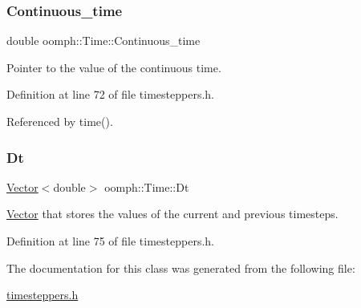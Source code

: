 \subsubsection{\texorpdfstring{Continuous\+\_\+time}{Continuous\_time}}
{\footnotesize\ttfamily double oomph\+::\+Time\+::\+Continuous\+\_\+time\hspace{0.3cm}{\ttfamily [private]}}



Pointer to the value of the continuous time. 



Definition at line 72 of file timesteppers.\+h.



Referenced by time().

\mbox{\label{classoomph_1_1Time_a3fbca07ec14a12aaffc2fbfc8503def2}} 
\subsubsection{\texorpdfstring{Dt}{Dt}}
{\footnotesize\ttfamily \hyperlink{classoomph_1_1Vector}{Vector}$<$double$>$ oomph\+::\+Time\+::\+Dt\hspace{0.3cm}{\ttfamily [private]}}



\hyperlink{classoomph_1_1Vector}{Vector} that stores the values of the current and previous timesteps. 



Definition at line 75 of file timesteppers.\+h.



The documentation for this class was generated from the following file\+:\begin{DoxyCompactItemize}
\item 
\hyperlink{timesteppers_8h}{timesteppers.\+h}\end{DoxyCompactItemize}
